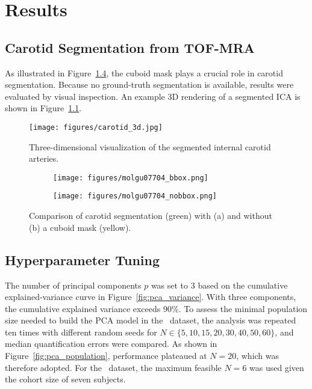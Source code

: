 \chapter{Results}

\section{Carotid Segmentation from TOF-MRA}
As illustrated in Figure~\ref{fig:seg_compare}, the cuboid mask plays a crucial role in carotid segmentation.
Because no ground-truth segmentation is available, results were evaluated by visual inspection.
An example 3D rendering of a segmented ICA is shown in Figure~\ref{fig:carotid_3d}.

\begin{figure}[h]
	\centering
	\texttt{[image: figures/carotid\_3d.jpg]}
	\caption{Three-dimensional visualization of the segmented internal carotid arteries.}
	\label{fig:carotid_3d}
\end{figure}

\begin{figure}[h]
	\centering
	\begin{subfigure}{0.45\textwidth}
		\texttt{[image: figures/molgu07704\_bbox.png]}
		\caption{}
		\label{subfig:seg_bbox}
	\end{subfigure}
	\begin{subfigure}{0.45\textwidth}
		\texttt{[image: figures/molgu07704\_nobbox.png]}
		\caption{}
		\label{subfig:seg_nobbox}
	\end{subfigure}
	\caption{Comparison of carotid segmentation (green) with (a) and without (b) a cuboid mask (yellow).}
	\label{fig:seg_compare}
\end{figure}

\section{Hyperparameter Tuning}
The number of principal components \(p\) was set to 3 based on the cumulative explained-variance curve in Figure~\ref{fig:pca_variance}.
With three components, the cumulative explained variance exceeds 90\%.
To assess the minimal population size needed to build the PCA model in the \fdg\ dataset, the analysis was repeated ten times with different random seeds for \(N\in\{5,10,15,20,30,40,50,60\}\), and median quantification errors were compared.
As shown in Figure~\ref{fig:pca_population}, performance plateaued at \(N=20\), which was therefore adopted.
For the \yohimbine\ dataset, the maximum feasible \(N=6\) was used given the cohort size of seven subjects.

